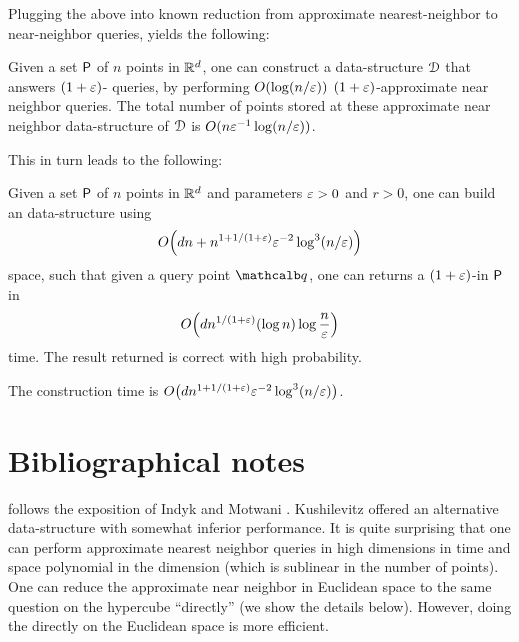 Plugging the above into known reduction from approximate  nearest-neighbor to
near-neighbor queries, yields the following:

\begin{corollary}
    Given a set ${\mathsf{P}}$ of $n$ points in $\mathbb{R}^d$, one can
    construct a data-structure $\EuScript{D}$ that answers $(1+{\varepsilon})$-\ANNbr
    queries, by performing $O( \log(n/{\varepsilon}) )$ $(1+{\varepsilon})$-approximate
    near neighbor queries. The total number of points stored at these
    approximate near neighbor data-structure of $\EuScript{D}$ is $O( n
    {\varepsilon}^{-1} \log(n/{\varepsilon}))$.
\end{corollary}

This in turn leads to the following:

\begin{theorem}%
    Given a set ${\mathsf{P}}$ of $n$ points in $\mathbb{R}^d$ and parameters
    ${\varepsilon}>0$ and $r > 0$, one can build an \ANNbr data-structure using
    \begin{align*}
        O\pth{\hdim n + n^{1+1/(1+\eps)} \eps^{-2} \log^3 (n/\eps) }
    \end{align*}
    space, such that given a query point $\query$, one can returns a
    $(1+{\varepsilon})$-\ANNbr in ${\mathsf{P}}$ in
    \begin{align*}
        O\pth{ \hdim n^{1/(1+\eps)} \pth{\log n} \log \frac{n}{\eps}}
    \end{align*}
    time. The result returned is correct with high probability.

    The construction time is $O\pth{\hdim n^{1+1/(1+\eps)} \eps^{-2}
       \log^3 (n/\eps) }$.
\end{theorem}








\section{Bibliographical notes} 

 follows the exposition of Indyk and
Motwani \cite{im-anntr-98}.  Kushilevitz \etal \cite{kor-esann-00}
offered an alternative data-structure with somewhat inferior
performance. It is quite surprising that one can perform approximate
nearest neighbor queries in high dimensions in time and space
polynomial in the dimension (which is sublinear in the number of
points). One can reduce the approximate near neighbor in Euclidean
space to the same question on the hypercube ``directly'' (we show the
details below). However, doing the \LSH directly on the Euclidean
space is more efficient.

